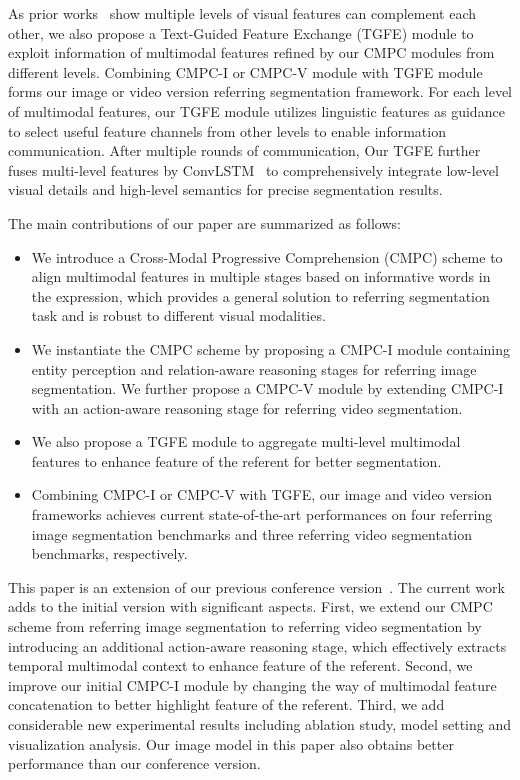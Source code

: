 \documentclass[10pt,journal,cspaper,compsoc]{IEEEtran}
\begin{document}
As prior works~\cite{li2018referring}\cite{ye2019cross}\cite{chen2019see} show multiple levels of visual features can complement each other, we also propose a Text-Guided Feature Exchange (TGFE) module to exploit information of multimodal features refined by our CMPC modules from different levels. 
Combining CMPC-I or CMPC-V module with TGFE module forms our image or video version referring segmentation framework. 
For each level of multimodal features, our TGFE module utilizes linguistic features 
as guidance to select useful feature channels from other levels to enable information 
communication. 
After multiple rounds of communication, Our TGFE further fuses multi-level features 
by ConvLSTM~\cite{xingjian2015convolutional} to comprehensively integrate low-level visual details and high-level semantics for precise segmentation results.

The main contributions of our paper are summarized as follows:
\begin{itemize}
   \item We introduce a Cross-Modal Progressive Comprehension (CMPC) scheme to align multimodal features in multiple stages based on informative words in the expression, which provides a general solution to referring segmentation task and is robust to different visual modalities.
   \item We instantiate the CMPC scheme by proposing a CMPC-I module containing entity perception and relation-aware reasoning stages for referring image segmentation. We further propose a CMPC-V module by extending CMPC-I with an action-aware reasoning stage for referring video segmentation.
   \item We also propose a TGFE module to aggregate multi-level multimodal features to enhance feature of the referent for better segmentation.
   \item Combining CMPC-I or CMPC-V with TGFE, our image and video version frameworks achieves current state-of-the-art performances on four referring image segmentation benchmarks and three referring video segmentation benchmarks, respectively.
\end{itemize}

This paper is an extension of our previous conference version~\cite{huang2020cmpc}. 
The current work adds to the initial version with significant aspects. 
First, we extend our CMPC scheme from referring image segmentation to referring video segmentation by introducing an additional action-aware reasoning stage, which effectively extracts temporal multimodal context to enhance feature of the referent. 
Second, we improve our initial CMPC-I module by changing the way of multimodal feature concatenation to better highlight feature of the referent. 
Third, we add considerable new experimental results including ablation study, model setting and visualization analysis. 
Our image model in this paper also obtains better performance than our conference version.
\end{document}
